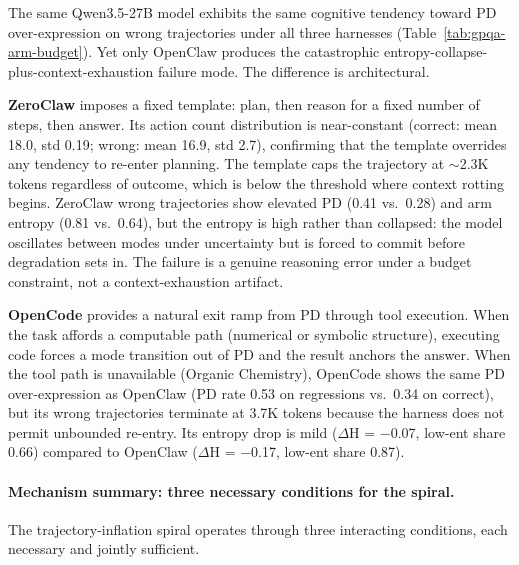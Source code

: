 The same Qwen3.5-27B model exhibits the same cognitive tendency toward PD
over-expression on wrong trajectories under all three harnesses
(Table~\ref{tab:gpqa-arm-budget}).
Yet only OpenClaw produces the catastrophic entropy-collapse-plus-context-exhaustion
failure mode.
The difference is architectural.

\textbf{ZeroClaw} imposes a fixed template: plan, then reason for a fixed number
of steps, then answer.
Its action count distribution is near-constant (correct: mean 18.0, std 0.19;
wrong: mean 16.9, std 2.7), confirming that the template overrides any tendency
to re-enter planning.
The template caps the trajectory at $\sim$2.3K tokens regardless of outcome,
which is below the threshold where context rotting begins.
ZeroClaw wrong trajectories show elevated PD (0.41 vs.\ 0.28) and arm entropy
(0.81 vs.\ 0.64), but the entropy is high rather than collapsed: the model
oscillates between modes under uncertainty but is forced to commit before
degradation sets in.
The failure is a genuine reasoning error under a budget constraint, not a
context-exhaustion artifact.

\textbf{OpenCode} provides a natural exit ramp from PD through tool execution.
When the task affords a computable path (numerical or symbolic structure),
executing code forces a mode transition out of PD and the result anchors the
answer.
When the tool path is unavailable (Organic Chemistry), OpenCode shows the same
PD over-expression as OpenClaw (PD rate 0.53 on regressions vs.\ 0.34 on
correct), but its wrong trajectories terminate at 3.7K tokens because the
harness does not permit unbounded re-entry.
Its entropy drop is mild ($\Delta$H = $-$0.07, low-ent share 0.66) compared to
OpenClaw ($\Delta$H = $-$0.17, low-ent share 0.87).

\paragraph{Mechanism summary: three necessary conditions for the spiral.}

The trajectory-inflation spiral operates through three interacting conditions,
each necessary and jointly sufficient.

